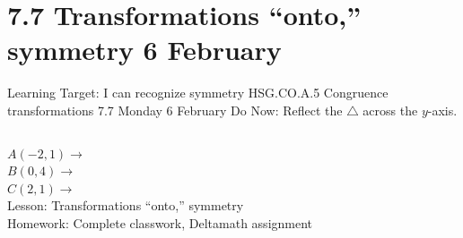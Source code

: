 \documentclass[onlytextwidth, aspectratio=169]{beamer}
\begin{document}
\section{7.7 Transformations ``onto,'' symmetry \hfill 6 February \,}
\begin{frame}{Learning Target: I can recognize symmetry}
  {HSG.CO.A.5 Congruence transformations \hfill \alert{7.7 Monday 6 February}}
  Do Now: Reflect the $\triangle$ across the $y$-axis.  \vspace{0.5cm}
  \begin{columns}
    $A(-2,1) \rightarrow$ \\[0.3cm]
    $B(0,4) \rightarrow$ \\[0.3cm]
    $C(2,1) \rightarrow$ \\[0.3cm]
    Lesson: Transformations ``onto,'' symmetry \\[0.5cm]
    Homework: Complete classwork, Deltamath assignment
    \begin{flushright}
    \end{flushright}
  \end{columns}
\end{frame}
\end{document}
